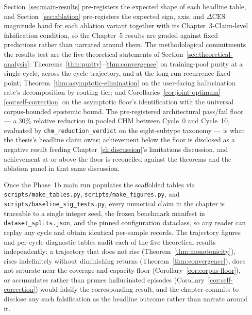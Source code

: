 Section~\ref{sec:main-results} pre-registers the expected shape of each headline table, and Section~\ref{sec:ablation} pre-registers the expected sign, axis, and $\Delta\text{CES}$ magnitude band for each ablation variant together with its Chapter~3-Claim-level falsification condition, so the Chapter~5 results are graded against fixed predictions rather than narrated around them. The methodological commitments the results test are the five theoretical statements of Section~\ref{sec:theoretical-analysis}: Theorems~\ref{thm:purity}--\ref{thm:convergence} on training-pool purity at a single cycle, across the cycle trajectory, and at the long-run recurrence fixed point; Theorem~\ref{thm:asymptotic-elimination} on the user-facing hallucination rate's decomposition by routing tier; and Corollaries~\ref{cor:joint-optimum}--\ref{cor:self-correction} on the asymptotic floor's identification with the universal corpus-bounded epistemic bound. The pre-registered architectural pass/fail floor --- a $30\%$ relative reduction in pooled CHM between Cycle~0 and Cycle~10, evaluated by \texttt{chm\_reduction\_verdict} on the eight-subtype taxonomy --- is what the thesis's headline claim owns; achievement below the floor is disclosed as a negative result feeding Chapter~\ref{ch:discussion}'s limitations discussion, and achievement at or above the floor is reconciled against the theorems and the ablation panel in that same discussion.

Once the Phase~1b main run populates the scaffolded tables via \texttt{scripts/make\_tables.py}, \texttt{scripts/make\_figures.py}, and \texttt{scripts/baseline\_sig\_tests.py}, every numerical claim in the chapter is traceable to a single integer seed, the frozen benchmark manifest in \texttt{dataset\_splits.json}, and the pinned configuration dataclass, so any reader can replay any cycle and obtain identical per-sample records. The trajectory figures and per-cycle diagnostic tables audit each of the five theoretical results independently: a trajectory that does not rise (Theorem~\ref{thm:monotonicity}), rises indefinitely without diminishing returns (Theorem~\ref{thm:convergence}), does not saturate near the coverage-and-capacity floor (Corollary~\ref{cor:corpus-floor}), or accumulates rather than prunes hallucinated episodes (Corollary~\ref{cor:self-correction}) would falsify the corresponding result, and the chapter commits to disclose any such falsification as the headline outcome rather than narrate around it.
